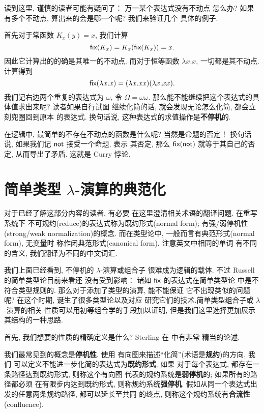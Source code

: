 读到这里, 谨慎的读者可能有疑问了： 万一某个表达式没有不动点
怎么办? 如果有多个不动点, 算出来的会是哪一个呢? 我们来验证几个
具体的例子.

首先对于常函数 \(K_x(y) = x\), 我们计算
\[\textsf{fix}(K_x) = K_x(\textsf{fix}(K_x)) = x.\]
因此它计算出的的确是其唯一的不动点. 而对于恒等函数
\(\lambda x. x\), 一切都是其不动点. 计算得到
\[\textsf{fix}(\lambda x.x) = (\lambda x.xx)(\lambda x.xx).\]
我们记右边两个重复的表达式为 \(\omega\), 令 \(\Omega = \omega\omega\).
那么能不能继续把这个表达式的具体值求出来呢? 读者如果自行试图
继续化简的话, 就会发现无论怎么化简, 都会立刻兜圈回到原本
的表达式. 换句话说, 这种表达式的求值操作是\textbf{不停机}的.

在逻辑中, 最简单的不存在不动点的函数是什么呢? 当然是命题的否定！
换句话说, 如果我们记 \(\textsf{not}\) 接受一个命题, 表示
其否定, 那么 \(\textsf{fix}(\textsf{not})\) 就等于其自己的否定,
从而导出了矛盾. 这就是 Curry 悖论.

\section{简单类型 \texorpdfstring{\(\lambda\)}{Lambda}-演算的典范化}
\label{beginning:ccc}
\begin{center}
\begin{tcolorbox}[text width=0.8\textwidth, title=关于译名]
对于已经了解这部分内容的读者, 有必要
在这里澄清相关术语的翻译问题. 在重写系统下
不可规约(reduce)的表达式称为既约形式(normal form);
有强/弱停机性(strong/weak normalization)的概念.
而在类型论中, 一般而言有典范形式(normal form), 无变量时
称作闭典范形式(canonical form). 注意英文中相同的单词
有不同的含义, 我们翻译为不同的中文词汇.
\end{tcolorbox}
\end{center}

我们上面已经看到, 不停机的 \(\lambda\)-演算或组合子
很难成为逻辑的载体. 不过 Russell 的简单类型论目前来看还
没有受到影响： 诸如 \(\textsf{fix}\) 的表达式在简单类型论
中是不符合类型规则的. 那么对于添加了类型的演算, 能不能保证
它不出现类似的问题呢? 在这个时期, 诞生了很多类型论以及对应
研究它们的技术.简单类型组合子或 \(\lambda\)-演算的相关
性质可以用初等组合学的手段加以证明\cite{loader:1998:stlc},
但是我们这里选择更加展示其结构的一种思路\cite[\S4.2]{sterling:2021:thesis}.

首先, 我们想要的性质的精确定义是什么? Sterling
在 \cite[\S5.1]{sterling:2021:thesis} 中有非常
精当的论述.

我们最常见到的概念是\textbf{停机性}. 使用
有向图来描述“化简”(术语是\textbf{规约})的方向, 我们
可以定义不能进一步化简的表达式为\textbf{既约形式}. 如果
对于每个表达式, 都存在一条路径达到既约形式, 则称这个有向图
代表的规约系统是\textbf{弱停机}的; 如果所有的路径都必须
在有限步内达到既约形式, 则称规约系统\textbf{强停机}.
假如从同一个表达式出发的任意两条规约路径, 都可以延长至共同
的终点, 则称这个规约系统有\textbf{合流性}(confluence).

